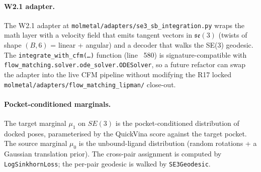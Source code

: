 
\paragraph{W2.1 adapter.}
The W2.1 adapter at
\texttt{molmetal/adapters/se3\_sb\_integration.py} wraps the math
layer with a velocity field that emits tangent vectors in $(3)$
(twists of shape $(B, 6)$ = linear + angular) and a decoder that
walks the SE(3) geodesic.  The
\texttt{integrate\_with\_cfm(\dots)} function (line ~580) is
signature-compatible with
\texttt{flow\_matching.solver.ode\_solver.ODESolver}, so a future
refactor can swap the adapter into the live CFM pipeline without
modifying the R17 locked
\texttt{molmetal/adapters/flow\_matching\_lipman/} close-out.

\paragraph{Pocket-conditioned marginals.}
The target marginal $\mu_1$ on $SE(3)$ is the pocket-conditioned
distribution of docked poses, parameterised by the QuickVina
score against the target pocket.  The source marginal $\mu_0$ is the
unbound-ligand distribution (random rotations + a Gaussian
translation prior).  The cross-pair assignment is computed by
\texttt{LogSinkhornLoss}; the per-pair geodesic is walked by
\texttt{SE3Geodesic}.

